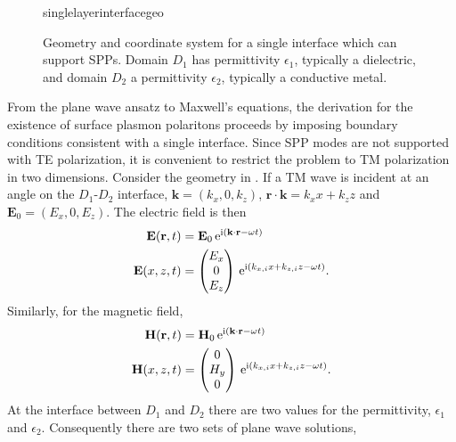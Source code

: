 \begin{figure}[ht]
 \centering
 {singlelayerinterfacegeo}
	\caption{Geometry and coordinate system for a single interface which can
support SPPs.  Domain $D_1$ has permittivity $\epsilon_1$, typically a
dielectric, and domain $D_2$ a permittivity $\epsilon_2$, typically a
conductive metal.}
\label{fig:singleinterfacegeo}
\end{figure}

From the plane wave ansatz to Maxwell's equations, the
derivation for the existence of surface plasmon polaritons proceeds
by imposing boundary conditions consistent with a single
interface.  Since SPP modes are not supported with TE polarization, it is
convenient to restrict the problem to TM polarization in two dimensions.
Consider the geometry in .  If
a TM wave is incident at an angle on the $D_1$-$D_2$ interface,
$\mathbf{k}=(k_x,0,k_z)$,
$\mathbf{r}\cdot\mathbf{k}=k_x x + k_z z$ and $\mathbf{E}_0 = (E_x, 0,
E_z)$. The electric field is then
\begin{align}
\mathbf{E} ( \mathbf{r}, t ) &= \mathbf{E}_0\, {\mathrm{e}}^{{\mathrm{i}} (\mathbf{k}
\cdot \mathbf{r} - \omega t )}\\
\mathbf{E}(x,z,t)&=\begin{pmatrix}
E_x\\ 0\\ E_z
\end{pmatrix}
\, {\mathrm{e}}^{{\mathrm{i}}(k_{x,i}x+k_{z,i}z-\omega t)}.
\label{eqn:planewavexz}
\end{align}
Similarly, for the magnetic field,
\begin{align}
\mathbf{H} ( \mathbf{r}, t ) &= \mathbf{H}_0\, {\mathrm{e}}^{{\mathrm{i}} (\mathbf{k}
\cdot \mathbf{r} - \omega t )}\\
\mathbf{H}(x,z,t)&=\begin{pmatrix}
0\\ H_y\\ 0
\end{pmatrix}
\, {\mathrm{e}}^{{\mathrm{i}}(k_{x,i}x+k_{z,i}z-\omega t)}.
\end{align}
At the interface between $D_1$ and $D_2$ there are two values for the permittivity,
$\epsilon_1$ and $\epsilon_2$.  Consequently there are two sets of plane
wave solutions,
